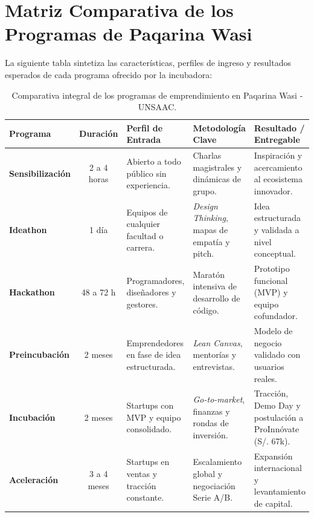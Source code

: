 ﻿\documentclass[12pt,a4paper]{article}
\begin{document}
\newpage
\section{Matriz Comparativa de los Programas de Paqarina Wasi}

La siguiente tabla sintetiza las características, perfiles de ingreso y resultados esperados de cada programa ofrecido por la incubadora:

\begin{table}[htbp]
\centering
\small
\renewcommand{\arraystretch}{1.3}
\begin{tabularx}{\textwidth}{p{2.5cm} c p{2.8cm} p{3.2cm} >{\raggedright\arraybackslash}X}
\toprule
\rowcolor{tableHeader}
\textbf{Programa} & \textbf{Duración} & \textbf{Perfil de Entrada} & \textbf{Metodología Clave} & \textbf{Resultado / Entregable} \\
\midrule
\rowcolor{tableStripe}
\textbf{Sensibilización} & 2 a 4 horas & Abierto a todo público sin experiencia. & Charlas magistrales y dinámicas de grupo. & Inspiración y acercamiento al ecosistema innovador. \\
\textbf{Ideathon} & 1 día & Equipos de cualquier facultad o carrera. & \textit{Design Thinking}, mapas de empatía y pitch. & Idea estructurada y validada a nivel conceptual. \\
\rowcolor{tableStripe}
\textbf{Hackathon} & 48 a 72 h & Programadores, diseñadores y gestores. & Maratón intensiva de desarrollo de código. & Prototipo funcional (MVP) y equipo cofundador. \\
\textbf{Preincubación} & 2 meses & Emprendedores en fase de idea estructurada. & \textit{Lean Canvas}, mentorías y entrevistas. & Modelo de negocio validado con usuarios reales. \\
\rowcolor{tableStripe}
\textbf{Incubación} & 2 meses & Startups con MVP y equipo consolidado. & \textit{Go-to-market}, finanzas y rondas de inversión. & Tracción, Demo Day y postulación a ProInnóvate (S/. 67k). \\
\textbf{Aceleración} & 3 a 4 meses & Startups en ventas y tracción constante. & Escalamiento global y negociación Serie A/B. & Expansión internacional y levantamiento de capital. \\
\bottomrule
\end{tabularx}
\caption{Comparativa integral de los programas de emprendimiento en Paqarina Wasi - UNSAAC.}
\label{tab:paqarina_programas}
\end{table}
\end{document}

